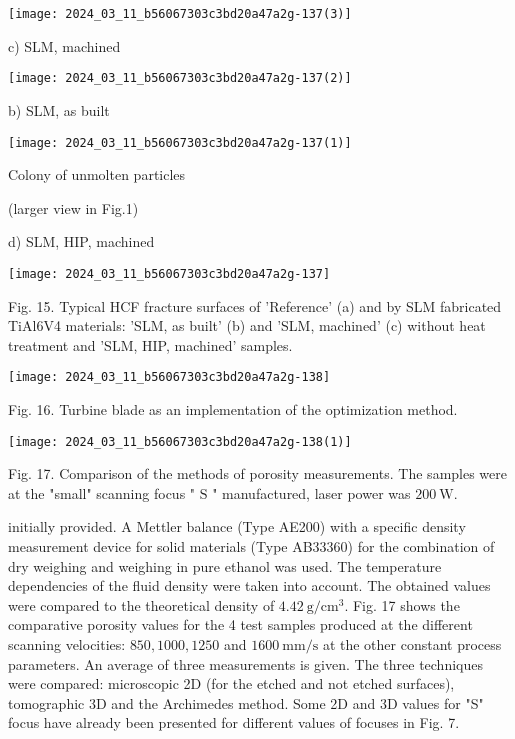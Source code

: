 \documentclass[10pt]{article}
\begin{document}
\begin{center}
\texttt{[image: 2024\_03\_11\_b56067303c3bd20a47a2g-137(3)]}
\end{center}

c) SLM, machined

\begin{center}
\texttt{[image: 2024\_03\_11\_b56067303c3bd20a47a2g-137(2)]}
\end{center}

b) SLM, as built

\begin{center}
\texttt{[image: 2024\_03\_11\_b56067303c3bd20a47a2g-137(1)]}
\end{center}

Colony of unmolten particles

(larger view in Fig.1)

d) SLM, HIP, machined

\begin{center}
\texttt{[image: 2024\_03\_11\_b56067303c3bd20a47a2g-137]}
\end{center}

Fig. 15. Typical HCF fracture surfaces of 'Reference' (a) and by SLM fabricated TiAl6V4 materials: 'SLM, as built' (b) and 'SLM, machined' (c) without heat treatment and 'SLM, HIP, machined' samples.

\begin{center}
\texttt{[image: 2024\_03\_11\_b56067303c3bd20a47a2g-138]}
\end{center}

Fig. 16. Turbine blade as an implementation of the optimization method.

\begin{center}
\texttt{[image: 2024\_03\_11\_b56067303c3bd20a47a2g-138(1)]}
\end{center}

Fig. 17. Comparison of the methods of porosity measurements. The samples were at the "small" scanning focus " $\mathrm{S}$ " manufactured, laser power was $200 \mathrm{~W}$.

initially provided. A Mettler balance (Type AE200) with a specific density measurement device for solid materials (Type AB33360) for the combination of dry weighing and weighing in pure ethanol was used. The temperature dependencies of the fluid density were taken into account. The obtained values were compared to the theoretical density of $4.42 \mathrm{~g} / \mathrm{cm}^{3}$. Fig. 17 shows the comparative porosity values for the 4 test samples produced at the different scanning velocities: $850,1000,1250$ and $1600 \mathrm{~mm} / \mathrm{s}$ at the other constant process parameters. An average of three measurements is given. The three techniques were compared: microscopic 2D (for the etched and not etched surfaces), tomographic 3D and the Archimedes method. Some 2D and 3D values for "S" focus have already been presented for different values of focuses in Fig. 7.
\end{document}
